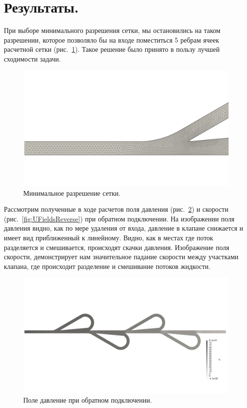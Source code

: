 \documentclass[10pt,a4paper]{book}
\begin{document}
        \section*{Результаты.}
        
        При выборе минимального разрешения сетки, мы остановились на таком разрешении, которое позволяло бы на входе поместиться 5 ребрам ячеек расчетной сетки (рис.~\ref{fig:minMesh}). Такое решение было принято в пользу лучшей сходимости задачи.
        
        \begin{figure}[H]
            \centering
            \includegraphics[width = 1\linewidth]{minMesh}
            \caption{Минимальное разрешение сетки.}
            \label{fig:minMesh}
        \end{figure}
        
        Рассмотрим полученные в ходе расчетов поля давления (рис.~\ref{fig:PFieldsReverse}) и скорости (рис.~\ref{fig:UFieldsReverse}) при обратном подключении. На изображении поля давления видно, как по мере удаления от входа, давление в клапане снижается и имеет вид приближенный к линейному. Видно, как в местах где поток разделяется и смешивается, происходят скачки давления. Изображение поля скорости, демонстрирует нам значительное падание скорости между участками клапана, где происходит разделение и смешивание потоков жидкости.
        
        \begin{figure}[H]
            \centering
            \includegraphics[width = 1\linewidth]{PFieldsReverse}
            \caption{Поле давление при обратном подключении.}
            \label{fig:PFieldsReverse}
        \end{figure}
        
\end{document}
